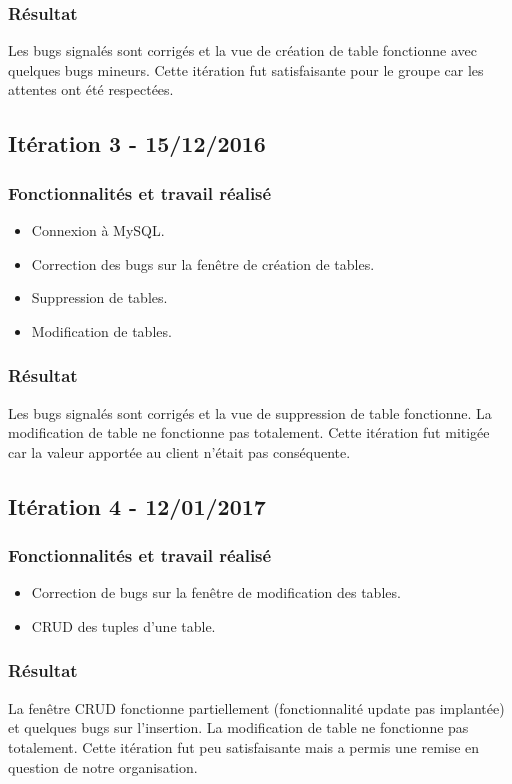 \subsubsection{Résultat}
Les bugs signalés sont corrigés et la vue de création de table fonctionne avec quelques bugs mineurs.
Cette itération fut satisfaisante pour le groupe car les attentes ont été respectées.

\subsection{Itération 3 - 15/12/2016}
\subsubsection{Fonctionnalités et travail réalisé}
\begin{itemize}
\item Connexion à MySQL.
\item Correction des bugs sur la fenêtre de création de tables.
\item Suppression de tables.
\item Modification de tables.
\end{itemize}

\subsubsection{Résultat}
Les bugs signalés sont corrigés et la vue de suppression de table fonctionne.
La modification de table ne fonctionne pas totalement.
Cette itération fut mitigée car la valeur apportée au client n'était pas conséquente. 


\subsection{Itération 4 - 12/01/2017}
\subsubsection{Fonctionnalités et travail réalisé}
\begin{itemize}
\item Correction de bugs sur la fenêtre de modification des tables.
\item CRUD des tuples d'une table.
\end{itemize}

\subsubsection{Résultat}
La fenêtre CRUD fonctionne partiellement (fonctionnalité update pas implantée) et quelques bugs sur l'insertion. 
La modification de table ne fonctionne pas totalement.
Cette itération fut peu satisfaisante mais a permis une remise en question de notre organisation. 

